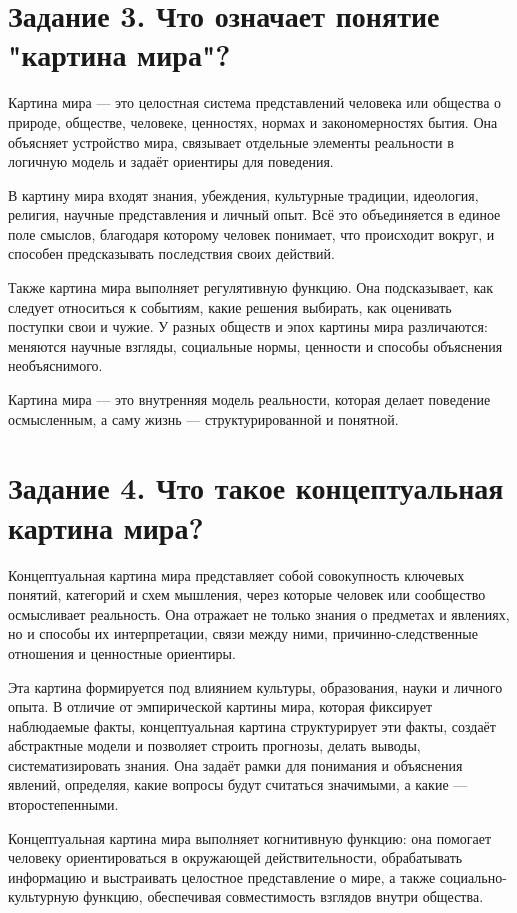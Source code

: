 \documentclass[14pt,a4paper]{extarticle}
\begin{document}
\section{Задание 3. Что означает понятие "картина мира"?}
\begin{sloppypar}
Картина мира — это целостная система представлений человека или общества о
    природе, обществе, человеке, ценностях, нормах и закономерностях бытия. Она
    объясняет устройство мира, связывает отдельные элементы реальности в
    логичную модель и задаёт ориентиры для поведения.

    В картину мира входят знания, убеждения, культурные традиции, идеология,
    религия, научные представления и личный опыт. Всё это объединяется в единое
    поле смыслов, благодаря которому человек понимает, что происходит вокруг, и
    способен предсказывать последствия своих действий.

    Также картина мира выполняет регулятивную функцию. Она подсказывает, как
    следует относиться к событиям, какие решения выбирать, как оценивать
    поступки свои и чужие. У разных обществ и эпох картины мира различаются:
    меняются научные взгляды, социальные нормы, ценности и способы объяснения
    необъяснимого.

    Картина мира — это внутренняя модель реальности, которая делает
    поведение осмысленным, а саму жизнь — структурированной и понятной.
\end{sloppypar}

\section{Задание 4. Что такое концептуальная картина мира?}
\begin{sloppypar}
Концептуальная картина мира представляет собой совокупность ключевых понятий,
    категорий и схем мышления, через которые человек или сообщество осмысливает
    реальность. Она отражает не только знания о предметах и явлениях, но и
    способы их интерпретации, связи между ними, причинно-следственные отношения
    и ценностные ориентиры.

    Эта картина формируется под влиянием культуры, образования, науки и личного
    опыта. В отличие от эмпирической картины мира, которая фиксирует
    наблюдаемые факты, концептуальная картина структурирует эти факты, создаёт
    абстрактные модели и позволяет строить прогнозы, делать выводы,
    систематизировать знания. Она задаёт рамки для понимания и объяснения
    явлений, определяя, какие вопросы будут считаться значимыми, а какие —
    второстепенными.

    Концептуальная картина мира выполняет когнитивную функцию: она помогает
    человеку ориентироваться в окружающей действительности, обрабатывать
    информацию и выстраивать целостное представление о мире, а также
    социально-культурную функцию, обеспечивая совместимость взглядов внутри
    общества.
\end{sloppypar}
\end{document}
